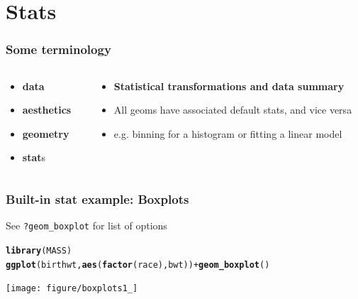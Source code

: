 \documentclass{beamer}\usepackage[]{graphicx}\usepackage[]{color}
\makeatletter
\newcommand{\hlopt}[1]{\textcolor[rgb]{0,0,0}{#1}}%
\newcommand{\hlstd}[1]{\textcolor[rgb]{0.345,0.345,0.345}{#1}}%
\newcommand{\hlkwd}[1]{\textcolor[rgb]{0.737,0.353,0.396}{\textbf{#1}}}%
\newenvironment{kframe}{%
 \def\at@end@of@kframe{}%
 \ifinner\ifhmode%
  \def\at@end@of@kframe{\end{minipage}}%
  \begin{minipage}{\columnwidth}%
 \fi\fi%
 \def\FrameCommand##1{\hskip\@totalleftmargin \hskip-\fboxsep
 \colorbox{shadecolor}{##1}\hskip-\fboxsep
     \hskip-\linewidth \hskip-\@totalleftmargin \hskip\columnwidth}%
 \MakeFramed {\advance\hsize-\width
   \@totalleftmargin\z@ \linewidth\hsize
   \@setminipage}}%
 {\par\unskip\endMakeFramed%
 \at@end@of@kframe}
\newenvironment{knitrout}{}{} %
\makeatother
\begin{document}
\section*{Stats}
\frame{\sectionpage}


\begin{frame}[fragile]
\frametitle{Some terminology}
\begin{columns}[t]

\begin{column}[T]{3cm}
\begin{itemize}
    \item \textbf{\color{gray}data}
    \item \textbf{\color{gray}aesthetics}
    \item \textbf{\color{gray}geometry}
    \item \textbf{stat}s
\end{itemize}
\end{column}

\begin{column}[T]{8cm}
\begin{itemize}
    \item \textbf{Statistical transformations and data summary}
    \item All geoms have associated default stats, and vice versa
    \item e.g. binning for a histogram or fitting a linear model
\end{itemize}
\end{column}

\end{columns}
\end{frame}


\begin{frame}[fragile]
\frametitle{Built-in stat example: Boxplots}
See \texttt{?geom\_boxplot} for list of options
\begin{knitrout}\footnotesize
{}\color{fgcolor}\begin{kframe}
\begin{alltt}
\hlkwd{library}\hlstd{(MASS)}
\hlkwd{ggplot}\hlstd{(birthwt,} \hlkwd{aes}\hlstd{(}\hlkwd{factor}\hlstd{(race), bwt))} \hlopt{+} \hlkwd{geom_boxplot}\hlstd{()}
\end{alltt}
\end{kframe}

{\centering \texttt{[image: figure/boxplots1\_]} 

}



\end{knitrout}
\end{frame}
\end{document}
